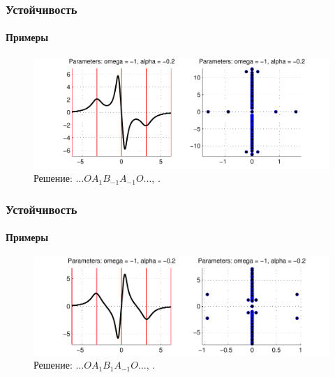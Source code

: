 \documentclass [10pt] {beamer}
\begin{document}
\begin{frame}
	\frametitle{Устойчивость}
	\framesubtitle{Примеры}
	
	\begin{figure}
		\includegraphics[width=1\textwidth]{pic/example_7.pdf}
		\caption{Решение: $\dots O A_1 B_{-1} A_{-1} O \dots$, {\it \color{fireenginered}{экспоненциально неустойчиво}}.}
		\label{pic:example_7}
	\end{figure}
\end{frame}

\begin{frame}
	\frametitle{Устойчивость}
	\framesubtitle{Примеры}
	
	\begin{figure}
		\includegraphics[width=1\textwidth]{pic/example_8.pdf}
		\caption{Решение: $\dots O A_1 B_1 A_{-1} O \dots$, {\it \color{fireenginered}{осцилляторно неустойчиво}}.}
		\label{pic:example_8}
	\end{figure}
\end{frame}
\end{document}
